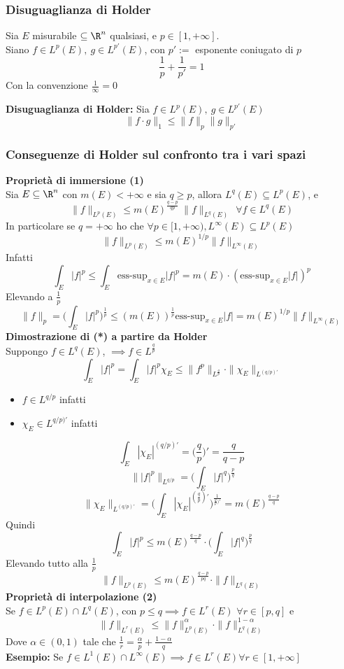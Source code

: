 \subsubsection{Disuguaglianza di Holder}
\begin{tcolorbox}
	Sia $E$ misurabile $\subseteq \R^n$ qualsiasi, e $p \in [1,+\infty]$.
	\\Siano $f\in L^p(E),\ g\in L^{p'}(E)$, con $p':=$ esponente coniugato di $p$
	\[\frac{1}{p}+\frac{1}{p'}=1\]
	Con la convenzione $\frac{1}{\infty}=0$ 
\end{tcolorbox}
\begin{tcolorbox}
	\textbf{Disuguaglianza di Holder: }Sia $f\in L^p(E),\ g\in L^{p'}(E)$
	\[\|f\cdot g\|_1\le \|f\|_p\|g\|_{p'}\]
\end{tcolorbox}
\subsubsection{Conseguenze di Holder sul confronto tra i vari spazi}
\textbf{Proprietà di immersione (1)}\\ 
Sia $E\subseteq \R^n$ con $m(E)<+\infty$ e sia $q\ge p$, allora $L^q(E)\subseteq L^p(E)$, e 
\[\|f\|_{L^p(E)}\le m(E)^{\frac{q-p}{qp}}\ \|f\|_{L^q(E)}\ \ \forall f\in L^q(E)\]
In particolare se $q=+\infty$ ho che $\forall p\in[1,+\infty),L^\infty(E)\subseteq L^p(E)$
\[\|f\|_{L^p(E)}\le m(E)^{1 / p}\|f\|_{L^\infty(E)}\]
Infatti
\[\int_{E}^{} |f|^p\le \int_{E}^{} \text{ess-sup}_{x\in E}|f|^p=m(E)\cdot (\text{ess-sup}_{x\in E}|f|)^p\]
Elevando a $\frac{1}{p}$
\[\|f\|_p=\bigg(\int_{E}{|f|^p\bigg)^{\frac{1}{p}}}\le (m(E))^{\frac{1}{p}}\text{ess-sup}_{x\in E}|f|=m(E)^{1 / p}\|f\|_{L^\infty(E)}  \]
\textbf{Dimostrazione di (*) a partire da Holder}\\
Suppongo $f\in L^q(E)$, $\implies f\in L^{\frac{q}{p}}$
\[\int_{E}^{} |f|^p=\int_{E}^{} |f|^p\chi_E \le \|f^p\|_{L^{\frac{q}{p}}}\cdot \|\chi_E\|_{L^{(q / p)'}}\]
\begin{itemize}
	\item $f\in L^{q / p}$ infatti 
	\item $\chi_E\in L^{q / p )'}$ infatti
\end{itemize}
\[\int_{E}^{} |\chi_E|^{(q / p)'}=\bigg(\frac{q}{p}\bigg)'=\frac{q}{q-p}\]
\[\ \| |f|^p\|_{L^{q / p}}=\bigg(\int_{E}^{} |f|^q\bigg)^{\frac{p}{q}}\]
\[\|\chi_E\|_{L^{(q / p)'}}=\bigg( \int_{E}^{} |\chi_E|^{(\frac{q}{p})'}\bigg)^{\frac{1}{\frac{q}{p})'}}=m(E)^{\frac{q-p}{q}}\]
Quindi
\[\int_{E}^{} |f|^p\le m(E)^{\frac{q-p}{q}}\cdot \bigg(\int_{E}^{} |f|^q\bigg)^{\frac{p}{q}}\]
Elevando tutto alla $\frac{1}{p}$ 
\[\|f\|_{L^p(E)}\le m(E)^{\frac{q-p}{pq}}\cdot \|f\|_{L^{q}(E)}\]
\textbf{Proprietà di interpolazione (2)}\\
Se $f\in L^p(E)\cap L^q(E)$, con $p\le q\implies f\in L^r(E)$ $\forall  r\in [p,q]$ e
\[\|f\|_{L^r(E)}\le \|f\|_{L^p(E)}^\alpha\cdot \|f\|_{L^{q}(E)}^{1-\alpha}\]
Dove $\alpha\in (0,1)$ tale che $\frac{1}{r}=\frac{\alpha}{p}+\frac{1-\alpha}{q}$\\ 
\textbf{Esempio:} Se $f\in L^{1}(E)\cap L^{\infty}(E)\implies f\in L^{r}(E)\forall r\in [1,+\infty]$
